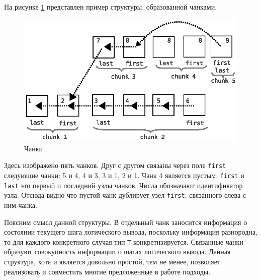 На рисунке \ref{fig:chank1} представлен пример структуры, образованной чанками.
\begin{figure}[h]
	\centering
	\includegraphics[width=0.6\linewidth]{pics/ChunkFull.eps}
	\caption{Чанки}
	\label{fig:chank1}
\end{figure}
Здесь изображено пять чанков. Друг с другом связаны через поле \texttt{first} следующие чанки: 5 и 4, 4 и 3, 3 и 1, 2 и 1. Чанк 4 является пустым. \texttt{first}  и \texttt{last} это первый и последний узлы чанков. Числа обозначают идентификатор узла. Отсюда видно что пустой чанк дублирует узел \texttt{first}. связанного слева с ним чанка.

Поясним смысл данной структуры. В отдельный чанк заносится информация о состоянии текущего шага логического вывода, поскольку информация разнородна, то для каждого конкретного случая тип {\tt T} конкретизируется. Связанные чанки образуют совокупность информации о шагах логического вывода. Данная структура, хотя и является довольно простой, тем не менее, позволяет реализовать и совместить многие предложенные в работе подходы.



